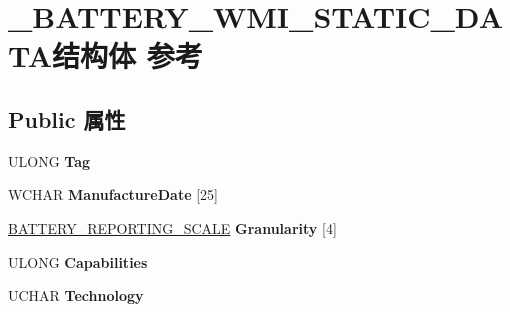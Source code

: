 \hypertarget{struct___b_a_t_t_e_r_y___w_m_i___s_t_a_t_i_c___d_a_t_a}{}\section{\+\_\+\+B\+A\+T\+T\+E\+R\+Y\+\_\+\+W\+M\+I\+\_\+\+S\+T\+A\+T\+I\+C\+\_\+\+D\+A\+T\+A结构体 参考}
\label{struct___b_a_t_t_e_r_y___w_m_i___s_t_a_t_i_c___d_a_t_a}
\subsection*{Public 属性}
\begin{DoxyCompactItemize}
\item 
\mbox{\label{struct___b_a_t_t_e_r_y___w_m_i___s_t_a_t_i_c___d_a_t_a_ab62e348ebffcff94f0914f5abdbdfe0f}} 
U\+L\+O\+NG {\bfseries Tag}
\item 
\mbox{\label{struct___b_a_t_t_e_r_y___w_m_i___s_t_a_t_i_c___d_a_t_a_a60b53307c436fad5bc4cd200a83bc94a}} 
W\+C\+H\+AR {\bfseries Manufacture\+Date} \mbox{[}25\mbox{]}
\item 
\mbox{\label{struct___b_a_t_t_e_r_y___w_m_i___s_t_a_t_i_c___d_a_t_a_af43c2a2018f089fd6eef9ada9a05609b}} 
\hyperlink{struct_b_a_t_t_e_r_y___r_e_p_o_r_t_i_n_g___s_c_a_l_e}{B\+A\+T\+T\+E\+R\+Y\+\_\+\+R\+E\+P\+O\+R\+T\+I\+N\+G\+\_\+\+S\+C\+A\+LE} {\bfseries Granularity} \mbox{[}4\mbox{]}
\item 
\mbox{\label{struct___b_a_t_t_e_r_y___w_m_i___s_t_a_t_i_c___d_a_t_a_a2324b9c08351ba609166d43be6791084}} 
U\+L\+O\+NG {\bfseries Capabilities}
\item 
\mbox{\label{struct___b_a_t_t_e_r_y___w_m_i___s_t_a_t_i_c___d_a_t_a_a2d7143a97f32f43e7216573ea01c81ef}} 
U\+C\+H\+AR {\bfseries Technology}
\item 
\mbox{\label{struct___b_a_t_t_e_r_y___w_m_i___s_t_a_t_i_c___d_a_t_a_ac9375934ca6865f84e5db906d0c2db50}} 

\end{DoxyCompactItemize}
